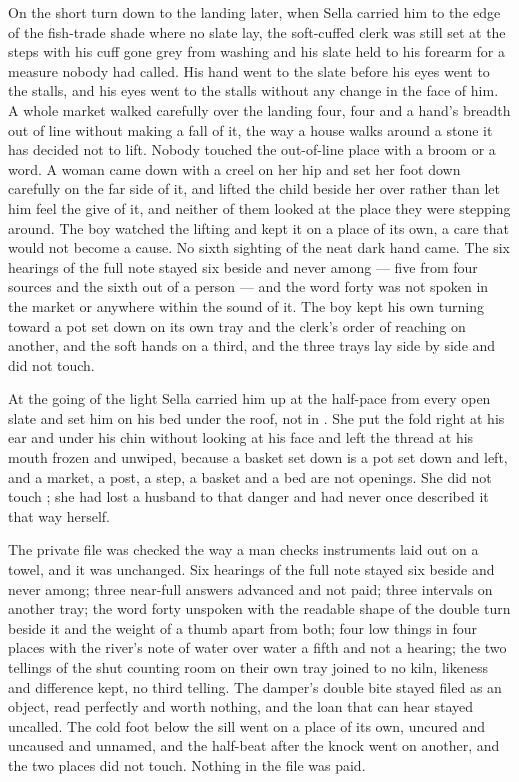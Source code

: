 On the short turn down to the landing later, when Sella carried him to the edge of the fish-trade shade where no slate lay, the soft-cuffed clerk was still set at the steps with his cuff gone grey from washing and his slate held to his forearm for a measure nobody had called. His hand went to the slate before his eyes went to the stalls, and his eyes went to the stalls without any change in the face of him. A whole market walked carefully over the landing four, four and a hand's breadth out of line without making a fall of it, the way a house walks around a stone it has decided not to lift. Nobody touched the out-of-line place with a broom or a word. A woman came down with a creel on her hip and set her foot down carefully on the far side of it, and lifted the child beside her over rather than let him feel the give of it, and neither of them looked at the place they were stepping around. The boy watched the lifting and kept it on a place of its own, a care that would not become a cause. No sixth sighting of the neat dark hand came. The six hearings of the full note stayed six beside and never among --- five from four sources and the sixth out of a person --- and the word forty was not spoken in the market or anywhere within the sound of it. The boy kept his own turning toward a pot set down on its own tray and the clerk's order of reaching on another, and the soft hands on a third, and the three trays lay side by side and did not touch.

\scenebreak

At the going of the light Sella carried him up  at the half-pace from every open slate and set him on his bed under the  roof, not in . She put the fold right at his ear and under his chin without looking at his face and left the thread at his mouth frozen and unwiped, because a basket set down is a pot set down and left, and a market, a post, a step, a basket and a bed are not openings. She did not touch ; she had lost a husband to that danger and had never once described it that way herself.

The private file was checked the way a man checks instruments laid out on a towel, and it was unchanged. Six hearings of the full note stayed six beside and never among; three near-full answers advanced and not paid; three intervals on another tray; the word forty unspoken with the readable shape of the double turn beside it and the weight of a thumb apart from both; four low things in four places with the river's note of water over water a fifth and not a hearing; the two tellings of the shut counting room on their own tray joined to no kiln, likeness and difference kept, no third telling. The damper's double bite stayed filed as an object, read perfectly and worth nothing, and the loan that can hear stayed uncalled. The cold foot below the sill went on a place of its own, uncured and uncaused and unnamed, and the half-beat after the knock went on another, and the two places did not touch. Nothing in the file was paid.

